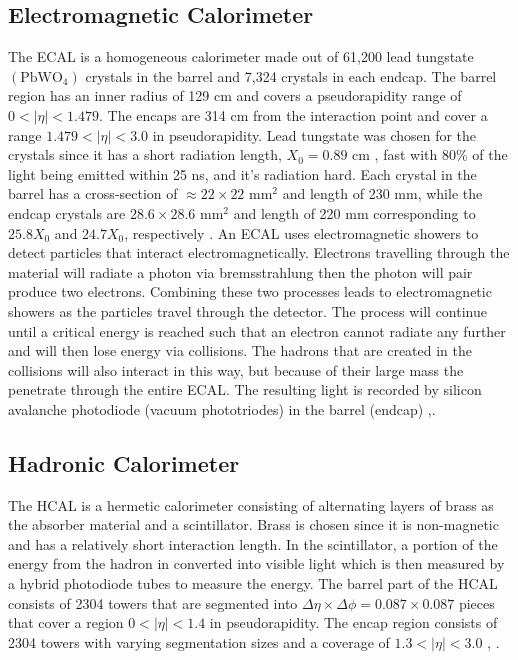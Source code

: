 \subsection{Electromagnetic Calorimeter}
\label{sec:ECAL}

The ECAL is a homogeneous calorimeter made out of 61,200 lead tungstate $(\text{PbWO}_4)$ crystals in the barrel and 7,324 crystals in each endcap. The barrel region has an inner radius of 129 cm and covers a pseudorapidity range of $0<|\eta|<1.479$. The encaps are 314 cm from the interaction point and cover a range $1.479<|\eta|<3.0$ in pseudorapidity. Lead tungstate was chosen for the crystals since it has a short radiation length, $X_0=0.89 \text{ cm }$, fast with 80\% of the light being emitted within 25 ns, and it's radiation hard. Each crystal in the barrel has a cross-section of $\approx22\times22 \text{ mm}^2$ and length of 230 mm, while the endcap crystals are $28.6\times28.6 \text{ mm}^2$ and length of 220 mm corresponding to $25.8X_0$ and $24.7X_0$, respectively \cite{noauthor_cms_1997}. An ECAL uses electromagnetic showers to detect particles that interact electromagnetically. Electrons travelling through the material will radiate a photon via bremsstrahlung then the photon will pair produce two electrons. Combining these two processes leads to electromagnetic showers as the particles travel through the detector. The process will continue until a critical energy is reached such that an electron cannot radiate any further and will then lose energy via collisions. The hadrons that are created in the collisions will also interact in this way, but because of their large mass the penetrate through the entire ECAL. The resulting light is recorded by silicon avalanche photodiode (vacuum phototriodes) in the barrel (endcap) \cite{noauthor_cms_1997},\cite{collaboration_cms_2007}. 

\subsection{Hadronic Calorimeter}
\label{sec:HCAL}

The HCAL is a hermetic calorimeter consisting of alternating layers of brass as the absorber material and a scintillator. Brass is chosen since it is non-magnetic and has a relatively short interaction length. In the scintillator, a portion of the energy from the hadron in converted into visible light which is then measured by a hybrid photodiode tubes to measure the energy. The barrel part of the HCAL consists of 2304 towers that are segmented into $\Delta\eta\times\Delta\phi=0.087\times0.087$ pieces that cover a region $0<|\eta|<1.4$ in pseudorapidity. The encap region consists of 2304 towers with varying segmentation sizes and a coverage of $1.3<|\eta|<3.0$ \cite{noauthor_cms_1997-1}, \cite{collaboration_cms_2007}. 


